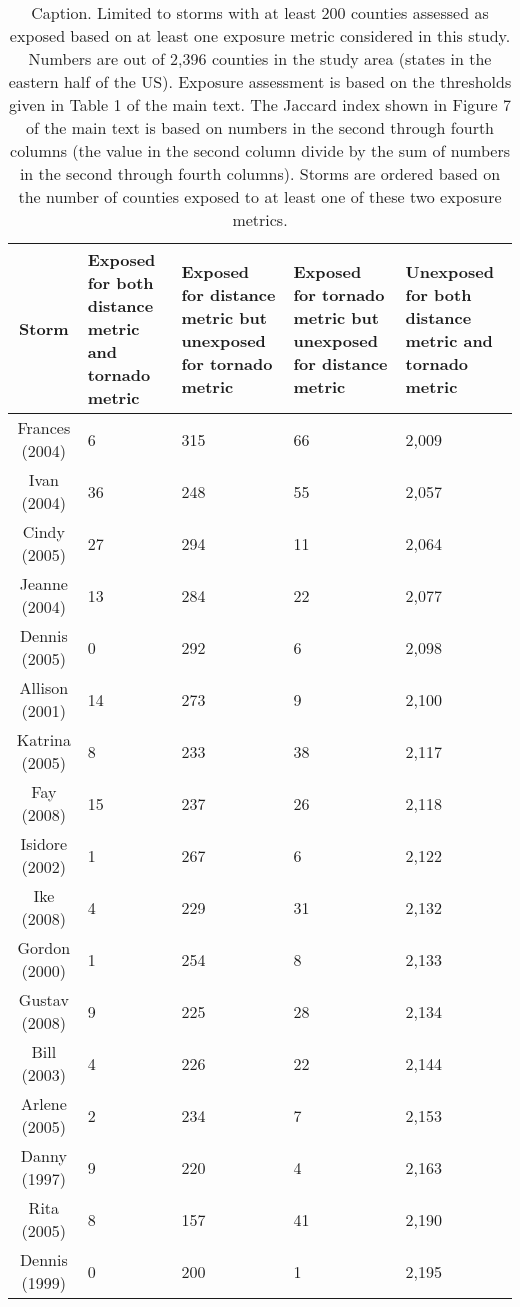 \begin{table}[ht]
\centering
\caption{Caption. Limited to storms with at least 200 counties assessed as exposed based on at least one exposure metric considered in this study. Numbers are out of 2,396 counties in the study area (states in the eastern half of the US). Exposure assessment is based on the thresholds given in Table 1 of the main text. The Jaccard index shown in Figure 7 of the main text is based on numbers in the second through fourth columns (the value in the second column divide by the sum of numbers in the second through fourth columns). Storms are ordered based on the number of counties exposed to at least one of these two exposure metrics.} 
\label{tab:misclasstornado}
\begin{tabular}{cP{3cm}P{3cm}P{3cm}P{3cm}}
  \toprule
Storm & Exposed for both distance metric and tornado metric & Exposed for distance metric but unexposed for tornado metric & Exposed for tornado metric but unexposed for distance metric & Unexposed for both distance metric and tornado metric \\ 
  \midrule
Frances (2004) & 6 & 315 & 66 & 2,009 \\ 
  Ivan (2004) & 36 & 248 & 55 & 2,057 \\ 
  Cindy (2005) & 27 & 294 & 11 & 2,064 \\ 
  Jeanne (2004) & 13 & 284 & 22 & 2,077 \\ 
  Dennis (2005) & 0 & 292 & 6 & 2,098 \\ 
  Allison (2001) & 14 & 273 & 9 & 2,100 \\ 
  Katrina (2005) & 8 & 233 & 38 & 2,117 \\ 
  Fay (2008) & 15 & 237 & 26 & 2,118 \\ 
  Isidore (2002) & 1 & 267 & 6 & 2,122 \\ 
  Ike (2008) & 4 & 229 & 31 & 2,132 \\ 
  Gordon (2000) & 1 & 254 & 8 & 2,133 \\ 
  Gustav (2008) & 9 & 225 & 28 & 2,134 \\ 
  Bill (2003) & 4 & 226 & 22 & 2,144 \\ 
  Arlene (2005) & 2 & 234 & 7 & 2,153 \\ 
  Danny (1997) & 9 & 220 & 4 & 2,163 \\ 
  Rita (2005) & 8 & 157 & 41 & 2,190 \\ 
  Dennis (1999) & 0 & 200 & 1 & 2,195 \\ 

\end{tabular}
\end{table}
